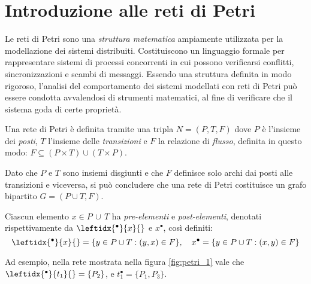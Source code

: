 \section{Introduzione alle reti di Petri}

Le reti di Petri sono una \emph{struttura matematica} ampiamente utilizzata 
per la modellazione dei sistemi distribuiti. Costituiscono un linguaggio
formale per rappresentare sistemi di processi concorrenti in cui
possono verificarsi conflitti, sincronizzazioni e scambi di messaggi.
Essendo una struttura definita in modo rigoroso, l'analisi del comportamento
dei sistemi modellati con reti di Petri può essere condotta avvalendosi di
strumenti matematici, al fine di verificare che il sistema goda di certe
proprietà.

\begin{definition}
\normalfont
Una rete di Petri è definita tramite una tripla $ N = (P, T, F) $ dove 
$P$ è l'insieme dei \emph{posti}, $T$ l'insieme delle \emph{transizioni}
e $F$ la relazione di \emph{flusso}, definita in questo modo: 
$F \subseteq (P \times T) \cup (T \times P) $.
\end{definition}

Dato che $P$ e $T$ sono insiemi disgiunti e che $F$ definisce solo archi dai
posti alle transizioni e viceversa, si può concludere che una rete di Petri
costituisce un grafo bipartito $G = (P \cup T , F) $.

\begin{definition}
\normalfont
Ciascun elemento $x \in P \, \cup \, T$ ha \emph{pre-elementi} e \emph{post-elementi}, 
denotati rispettivamente da $\leftidx{^\bullet}{x}{}$ e $x^{\bullet}$, così
definiti: 
$$ \leftidx{^\bullet}{x}{} = \{ y \in P \cup T : (y, x) \in F \},\quad
x^{\bullet} = \{ y \in P \cup T : (x, y) \in F \}$$

Ad esempio, nella rete mostrata nella figura \ref{fig:petri_1} vale che 
$\leftidx{^\bullet}{t_1}{} = \{P_2\}$, e $t_1^{\bullet} = \{P_1, P_3\}$.
\end{definition}


